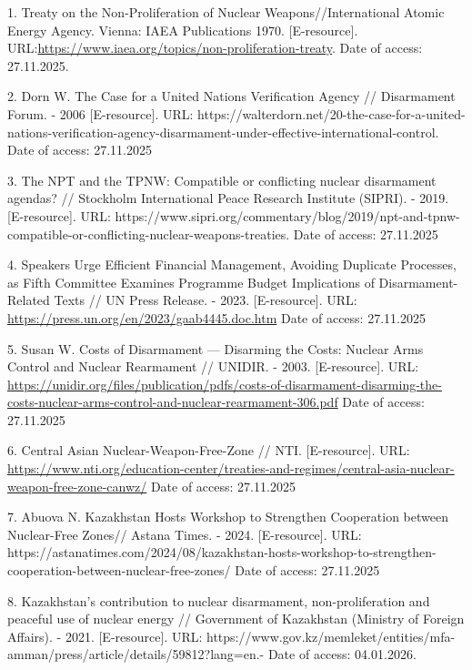 \begin{refs}
1. Treaty on the Non-Proliferation of Nuclear Weapons//International
Atomic Energy Agency. Vienna: IAEA Publications 1970. {[}E-resource{]}.
URL:\url{https://www.iaea.org/topics/non-proliferation-treaty}.
Date of access: 27.11.2025.

2. Dorn W. The Case for a United Nations Verification Agency //
Disarmament Forum. - 2006 {[}E-resource{]}. URL:
https://walterdorn.net/20-the-case-for-a-united-nations-verification-agency-disarmament-under-effective-international-control.
Date of access: 27.11.2025

3. The NPT and the TPNW: Compatible or conflicting nuclear disarmament
agendas? // Stockholm International Peace Research Institute (SIPRI). -
2019. {[}E-resource{]}. URL:
https://www.sipri.org/commentary/blog/2019/npt-and-tpnw-compatible-or-conflicting-nuclear-weapons-treaties.
Date of access: 27.11.2025

4. Speakers Urge Efficient Financial Management, Avoiding Duplicate
Processes, as Fifth Committee Examines Programme Budget Implications of
Disarmament-Related Texts // UN Press Release. - 2023. {[}E-resource{]}.
URL:
\href{https://press.un.org/en/2023/gaab4445.doc.htm}{https://press.un.org/en/2023/gaab4445.doc.htm}
Date of access: 27.11.2025

5. Susan W. Costs of Disarmament --- Disarming the Costs: Nuclear Arms
Control and Nuclear Rearmament // UNIDIR. - 2003. {[}E-resource{]}. URL:
\href{https://unidir.org/files/publication/pdfs/costs-of-disarmament-disarming-the-costs-nuclear-arms-control-and-nuclear-rearmament-306.pdf}{https://unidir.org/files/publication/pdfs/costs-of-disarmament-disarming-the-costs-nuclear-arms-control-and-nuclear-rearmament-306.pdf}
Date of access: 27.11.2025

6. Central Asian Nuclear-Weapon-Free-Zone // NTI. {[}E-resource{]}. URL:
\href{https://www.nti.org/education-center/treaties-and-regimes/central-asia-nuclear-weapon-free-zone-canwz/}{https://www.nti.org/education-center/treaties-and-regimes/central-asia-nuclear-weapon-free-zone-canwz/}
Date of access: 27.11.2025

7. Abuova N. Kazakhstan Hosts Workshop to Strengthen Cooperation between
Nuclear-Free Zones// Astana Times. - 2024. {[}E-resource{]}. URL:
https://astanatimes.com/2024/08/kazakhstan-hosts-workshop-to-strengthen-cooperation-between-nuclear-free-zones/
Date of access: 27.11.2025

8. Kazakhstan's contribution to nuclear disarmament, non-proliferation
and peaceful use of nuclear energy // Government of Kazakhstan (Ministry
of Foreign Affairs). - 2021. {[}E-resource{]}. URL:
https://www.gov.kz/memleket/entities/mfa-amman/press/article/details/59812?lang=en.-
Date of access: 04.01.2026.


\end{refs}
